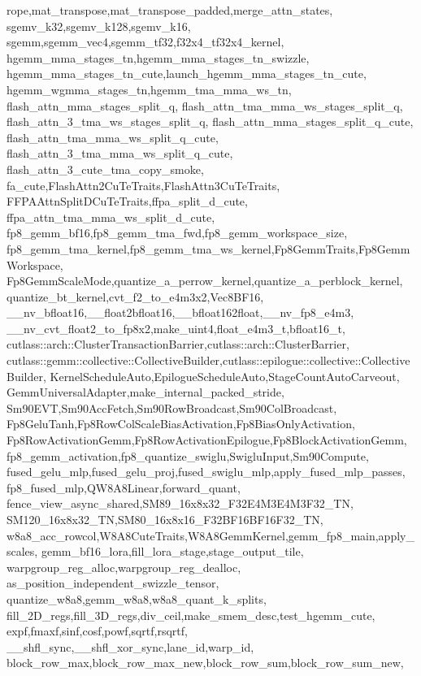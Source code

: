 {{    rope,mat_transpose,mat_transpose_padded,merge_attn_states,
    sgemv_k32,sgemv_k128,sgemv_k16,
    sgemm,sgemm_vec4,sgemm_tf32,f32x4_tf32x4_kernel,
    hgemm_mma_stages_tn,hgemm_mma_stages_tn_swizzle,
    hgemm_mma_stages_tn_cute,launch_hgemm_mma_stages_tn_cute,
    hgemm_wgmma_stages_tn,hgemm_tma_mma_ws_tn,
    flash_attn_mma_stages_split_q,
    flash_attn_tma_mma_ws_stages_split_q,
    flash_attn_3_tma_ws_stages_split_q,
    flash_attn_mma_stages_split_q_cute,
    flash_attn_tma_mma_ws_split_q_cute,
    flash_attn_3_tma_mma_ws_split_q_cute,
    flash_attn_3_cute_tma_copy_smoke,
    fa_cute,FlashAttn2CuTeTraits,FlashAttn3CuTeTraits,
    FFPAAttnSplitDCuTeTraits,ffpa_split_d_cute,
    ffpa_attn_tma_mma_ws_split_d_cute,
    fp8_gemm_bf16,fp8_gemm_tma_fwd,fp8_gemm_workspace_size,
    fp8_gemm_tma_kernel,fp8_gemm_tma_ws_kernel,Fp8GemmTraits,Fp8GemmWorkspace,
    Fp8GemmScaleMode,quantize_a_perrow_kernel,quantize_a_perblock_kernel,
    quantize_bt_kernel,cvt_f2_to_e4m3x2,Vec8BF16,
    __nv_bfloat16,__float2bfloat16,__bfloat162float,__nv_fp8_e4m3,
    __nv_cvt_float2_to_fp8x2,make_uint4,float_e4m3_t,bfloat16_t,
    cutlass::arch::ClusterTransactionBarrier,cutlass::arch::ClusterBarrier,
    cutlass::gemm::collective::CollectiveBuilder,cutlass::epilogue::collective::CollectiveBuilder,
    KernelScheduleAuto,EpilogueScheduleAuto,StageCountAutoCarveout,
    GemmUniversalAdapter,make_internal_packed_stride,
    Sm90EVT,Sm90AccFetch,Sm90RowBroadcast,Sm90ColBroadcast,
    Fp8GeluTanh,Fp8RowColScaleBiasActivation,Fp8BiasOnlyActivation,
    Fp8RowActivationGemm,Fp8RowActivationEpilogue,Fp8BlockActivationGemm,
    fp8_gemm_activation,fp8_quantize_swiglu,SwigluInput,Sm90Compute,
    fused_gelu_mlp,fused_gelu_proj,fused_swiglu_mlp,apply_fused_mlp_passes,
    fp8_fused_mlp,QW8A8Linear,forward_quant,
    fence_view_async_shared,SM89_16x8x32_F32E4M3E4M3F32_TN,
    SM120_16x8x32_TN,SM80_16x8x16_F32BF16BF16F32_TN,
    w8a8_acc_rowcol,W8A8CuteTraits,W8A8GemmKernel,gemm_fp8_main,apply_scales,
    gemm_bf16_lora,fill_lora_stage,stage_output_tile,
    warpgroup_reg_alloc,warpgroup_reg_dealloc,
    as_position_independent_swizzle_tensor,
    quantize_w8a8,gemm_w8a8,w8a8_quant_k_splits,
    fill_2D_regs,fill_3D_regs,div_ceil,make_smem_desc,test_hgemm_cute,
    expf,fmaxf,sinf,cosf,powf,sqrtf,rsqrtf,
    __shfl_sync,__shfl_xor_sync,lane_id,warp_id,
    block_row_max,block_row_max_new,block_row_sum,block_row_sum_new,
}}
